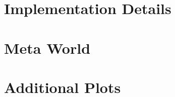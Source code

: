 \chapter{Implementation Details}
\label{chapter:DetailedDescriptions}\label{appendix}

\chapter{Meta World}
\label{chapter:MetaWorld}\label{appendix}

\chapter{Additional Plots}
\label{chapter:additional_plots}

